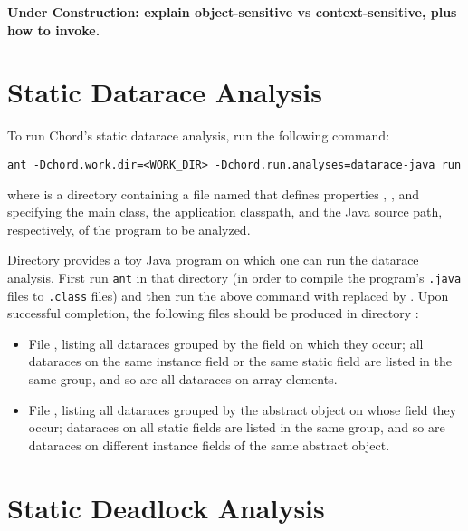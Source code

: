 {\bf Under Construction: explain object-sensitive vs context-sensitive, plus how
to invoke.}

\section{Static Datarace Analysis}

To run Chord's static datarace analysis, run the following command:

\begin{framed}
\begin{verbatim}
ant -Dchord.work.dir=<WORK_DIR> -Dchord.run.analyses=datarace-java run
\end{verbatim}
\end{framed}

where  is a directory
containing a file named  that defines
properties , , and
 specifying the main class, the application classpath, and
the Java source path, respectively, of the program to be analyzed.

Directory  provides a toy Java
program on which one can run the datarace analysis.  First run {\tt ant} in that
directory (in order to compile the program's {\tt .java} files to {\tt .class}
files) and then run the above command with  replaced by
.  Upon successful completion, the
following files should be produced in directory
:

\begin{itemize}
\item
File , listing all dataraces grouped by the field on
which they occur; all dataraces on the same instance field or the same static
field are listed in the same group, and so are all dataraces on array elements.
\item
File , listing all dataraces grouped by the abstract
object on whose field they occur; dataraces on all static fields are listed in
the same group, and so are dataraces on different instance fields of the same
abstract object.
\end{itemize}

\section{Static Deadlock Analysis}

